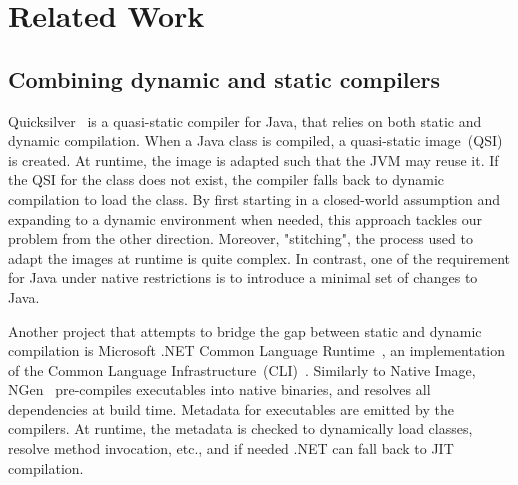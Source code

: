 \chapter{Related Work}


\section{Combining dynamic and static compilers}
Quicksilver~\cite{serrano_quicksilver_2000} is a quasi-static compiler for Java, that relies on both static and dynamic compilation. 
When a Java class is compiled, a quasi-static image~(QSI) is created. At runtime, the image is adapted such that the JVM may reuse it. If the QSI for the class does not exist, the compiler falls back to dynamic compilation to load the class. 
By first starting in a closed-world assumption and expanding to a dynamic environment when needed, this approach tackles our problem from the other direction.
Moreover, "stitching", the process used to adapt the images at runtime is quite complex. In contrast, one of the requirement for Java under native restrictions is to introduce a minimal set of changes to Java.

Another project that attempts to bridge the gap between static and dynamic compilation is Microsoft .NET Common Language Runtime~\cite{noauthor_common_2023}, an implementation of the Common Language Infrastructure~(CLI)~\cite{noauthor_common_2012}. 
Similarly to Native Image, NGen~\cite{noauthor_clr_2019} pre-compiles executables into native binaries, and resolves all dependencies at build time.
Metadata for executables are emitted by the compilers. At runtime, the metadata is checked to dynamically load classes, resolve method invocation, etc., and if needed .NET can fall back to JIT compilation.

